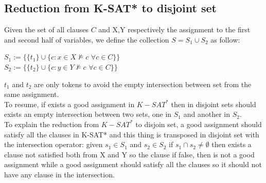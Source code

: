 \subsection{Reduction from K-SAT* to disjoint set}
Given the set of all clauses $ C $ and X,Y respectively the assignment to the first and second half of variables, we define the collection $ S = S_1 \cup S_2 $ as follow:
\begin{center}
	$ S_1:= \{ \{t_1\} \cup \{ c : x \in X \nvDash c \,\, \forall c \in C \} \}$ \\ \medskip
	$ S_2:= \{ \{t_2\} \cup \{ c : y \in Y \nvDash c \,\, \forall c \in C \} \}$
\end{center}
$ t_1 $ and $ t_2 $ are only tokens to avoid the empty intersection between set from the same assignment.\\
To resume, if exists a good assignment in $ K-SAT^* $ then in disjoint sets should exists an empty intersection between two sets, one in $ S_1 $ and another in $ S_2 $.\\
To explain the reduction from $ K-SAT^* $ to disjoin set, a good assignment should satisfy all the clauses in K-SAT* and this thing is transposed in disjoint set with the intersection operator: given $ s_1 \in S_1 $ and $ s_2 \in S_2 $ if $ s_1 \cap s_2 \ne \emptyset$ then exists a clause not satisfied both from X and Y so the clause if false, then is not a good assignment while a good assignment should satisfy all the clauses so it should not have any clause in the intersection.
